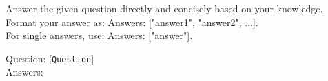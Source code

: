 \begin{tcolorbox}[colback=white, colframe=black, title=Prompte template for IO Prompt setup, boxrule=0.5pt, left=2mm, right=2mm, top=0mm, bottom=0.5mm]
\footnotesize
\label{tab:instruction_prompt}
 
Answer the given question directly and concisely based on your knowledge. \\
Format your answer as: Answers: ["answer1", "answer2", ...]. \\
For single answers, use: Answers: ["answer"]. 

Question: [\texttt{Question}] \\ 
Answers:
\end{tcolorbox}
